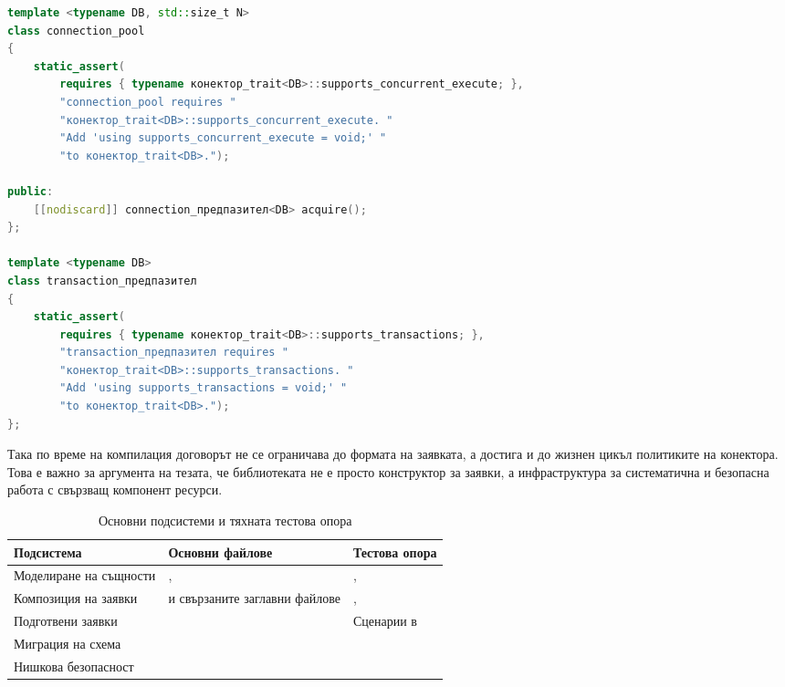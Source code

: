 \begin{lstlisting}[language=C++,caption={Извадка от нишкова безопасност помощен слоя},label={lst:нишка_safety_помощници}]
template <typename DB, std::size_t N>
class connection_pool
{
    static_assert(
        requires { typename конектор_trait<DB>::supports_concurrent_execute; },
        "connection_pool requires "
        "конектор_trait<DB>::supports_concurrent_execute. "
        "Add 'using supports_concurrent_execute = void;' "
        "to конектор_trait<DB>.");

public:
    [[nodiscard]] connection_предпазител<DB> acquire();
};

template <typename DB>
class transaction_предпазител
{
    static_assert(
        requires { typename конектор_trait<DB>::supports_transactions; },
        "transaction_предпазител requires "
        "конектор_trait<DB>::supports_transactions. "
        "Add 'using supports_transactions = void;' "
        "to конектор_trait<DB>.");
};
\end{lstlisting}

Така по време на компилация договорът не се ограничава до формата на заявката, а достига и до жизнен цикъл политиките на конектора. Това е важно за аргумента на тезата, че библиотеката не е просто конструктор за заявки, а инфраструктура за систематична и безопасна работа с свързващ компонент ресурси.

\begin{table}[H]
\centering
\small
\caption{Основни подсистеми и тяхната тестова опора}
\label{tab:core_subsystem_tests}
\begin{tabularx}{\textwidth}{L{3.1cm}L{4.1cm}Y}
\toprule
\textbf{Подсистема} & \textbf{Основни файлове} & \textbf{Тестова опора} \\
\midrule
Моделиране на същности & ,  & ,  \\
Композиция на заявки &  и свързаните заглавни файлове & ,  \\
Подготвени заявки &  & Сценарии  в  \\
Миграция на схема &  &  \\
Нишкова безопасност &  &  \\
\bottomrule
\end{tabularx}
\end{table}

